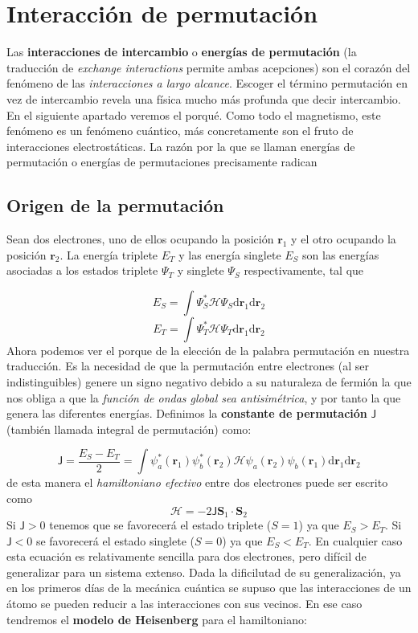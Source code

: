 \documentclass[12pt,a4paper]{book}
\numberwithin{equation}{section}
\numberwithin{figure}{section}
\newcommand{\D}{\mathrm{d}}
\newcommand{\Hcal}{\mathcal{H}}
\newcommand{\Jsf}{\mathsf{J}}
\newcommand{\rn}{\mathbf{r}}
\newcommand{\Sn}{\mathbf{S}}
\begin{document}
\section{Interacción de permutación}

Las \textbf{interacciones de intercambio} o \textbf{energías de permutación} (la traducción de \textit{exchange interactions} permite ambas acepciones) son el corazón del fenómeno de las \textit{interacciones a largo alcance}. Escoger el término permutación en vez de intercambio revela una física mucho más profunda que decir intercambio. En el siguiente apartado veremos el porqué. Como todo el magnetismo, este fenómeno es un fenómeno cuántico, más concretamente son el fruto de interacciones electrostáticas. La razón por la que se llaman energías de permutación o energías de permutaciones precisamente radican

\subsection{Origen de la permutación}
Sean dos electrones, uno de ellos ocupando la posición $\rn_1$ y el otro ocupando la posición $\rn_2$. La energía triplete $E_T$ y las energía singlete $E_S$ son las energías asociadas a los estados triplete  $\Psi_T$ y singlete $\Psi_S$ respectivamente, tal que

\begin{equation}
    E_S = \int \Psi_S^* \Hcal \Psi_S \D \rn_1 \D \rn_2
\end{equation}
\begin{equation}
    E_T = \int \Psi_T^* \Hcal \Psi_T \D \rn_1 \D \rn_2
\end{equation}
Ahora podemos ver el porque de la elección de la palabra permutación en nuestra traducción. Es la necesidad de que la permutación entre electrones (al ser indistinguibles) genere un signo negativo debido a su naturaleza de fermión la que nos obliga a que la \textit{función de ondas global sea antisimétrica}, y por tanto la que genera las diferentes energías. Definimos la \textbf{constante de permutación} $\mathsf{J}$ (también llamada integral de permutación) como:

\begin{equation}
    \Jsf = \frac{E_S - E_T}{2} = \int \psi_a^* (\rn_1) \psi_b^* (\rn_2) \Hcal \psi_a (\rn_2) \psi_b (\rn_1) \D \rn_1 \D \rn_2
\end{equation}
de esta manera el \textit{hamiltoniano efectivo} entre dos electrones puede ser escrito como
\begin{equation}
    \Hcal = - 2 \Jsf \Sn_1 \cdot \Sn_2 \label{Ec:04-02-05}
\end{equation}
Si $\Jsf>0$ tenemos que se favorecerá el estado triplete ($S=1$) ya que $E_S>E_T$. Si $\Jsf<0$ se favorecerá el estado singlete ($S=0$) ya que $E_S<E_T$. En cualquier caso esta ecuación es relativamente sencilla para dos electrones, pero difícil de generalizar para un sistema extenso. Dada la dificilutad de su generalización, ya en los primeros días de la mecánica cuántica se supuso que las interacciones de un átomo se pueden reducir a las interacciones con sus vecinos. En ese caso tendremos el \textbf{modelo de Heisenberg} para el hamiltoniano:
\end{document}
